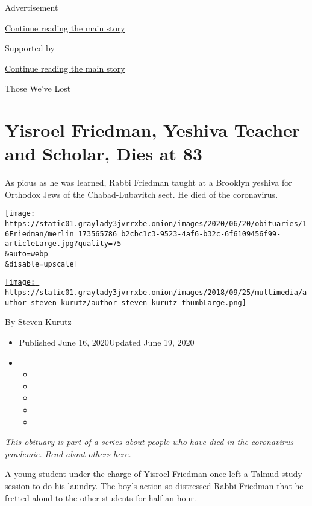 Advertisement

\protect\hyperlink{after-top}{Continue reading the main story}

Supported by

\protect\hyperlink{after-sponsor}{Continue reading the main story}

Those We've Lost

\hypertarget{yisroel-friedman-yeshiva-teacher-and-scholar-dies-at-83}{%
\section{Yisroel Friedman, Yeshiva Teacher and Scholar, Dies at
83}\label{yisroel-friedman-yeshiva-teacher-and-scholar-dies-at-83}}

As pious as he was learned, Rabbi Friedman taught at a Brooklyn yeshiva
for Orthodox Jews of the Chabad-Lubavitch sect. He died of the
coronavirus.

\texttt{[image: https://static01.graylady3jvrrxbe.onion/images/2020/06/20/obituaries/16Friedman/merlin\_173565786\_b2cbc1c3-9523-4af6-b32c-6f6109456f99-articleLarge.jpg?quality=75\\\&auto=webp\\\&disable=upscale]}

\href{https://www.nytimes3xbfgragh.onion/by/steven-kurutz}{\texttt{[image: https://static01.graylady3jvrrxbe.onion/images/2018/09/25/multimedia/author-steven-kurutz/author-steven-kurutz-thumbLarge.png]}}

By \href{https://www.nytimes3xbfgragh.onion/by/steven-kurutz}{Steven
Kurutz}

\begin{itemize}
\item
  Published June 16, 2020Updated June 19, 2020
\item
  \begin{itemize}
  \item
  \item
  \item
  \item
  \item
  \end{itemize}
\end{itemize}

\emph{This obituary is part of a series about people who have died in
the coronavirus pandemic. Read about others}
\href{https://www.nytimes3xbfgragh.onion/interactive/2020/obituaries/people-died-coronavirus-obituaries.html}{\emph{here}}\emph{.}

A young student under the charge of Yisroel Friedman once left a Talmud
study session to do his laundry. The boy's action so distressed Rabbi
Friedman that he fretted aloud to the other students for half an hour.


